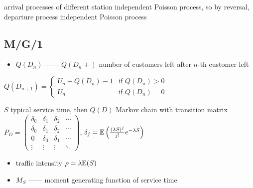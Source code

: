 \begin{fact}
    arrival processes of different station independent Poisson process, so by reversal, departure process independent Poisson process
\end{fact}

\subsection{M/G/1}\label{subsec:m/g/1}

\begin{itemize}
    \item $Q(D_n)$ ------ $Q(D_n+)$ number of customers left after $n$-th customer left
\end{itemize}

\begin{fact}
    $Q(D_{n+1}) =
    \begin{cases}
        U_n + Q(D_n) - 1 &\text{if } Q(D_n) > 0\\
        U_n &\text{if } Q(D_n) = 0
    \end{cases}$
\end{fact}

\begin{thm}
    $S$ typical service time, then $Q(D)$ Markov chain with transition matrix\\ $P_D = \begin{pmatrix}
                                                    \delta_0 & \delta_1 & \delta_2 & \cdots\\
                                                    \delta_0 & \delta_1 & \delta_2 &\cdots\\
                                                    0 & \delta_0 & \delta_1  &\cdots\\
                                                    \vdots & \vdots & \vdots & \ddots
    \end{pmatrix}$, $\delta_j = \mathbb{E}\left( \frac{(\lambda S)^j}{j!} e^{-\lambda S} \right)$
\end{thm}

\begin{itemize}
    \item traffic intensity $\rho = \lambda \mathbb{E}(S)$
    \item $M_S$ ------ moment generating function of service time
\end{itemize}

